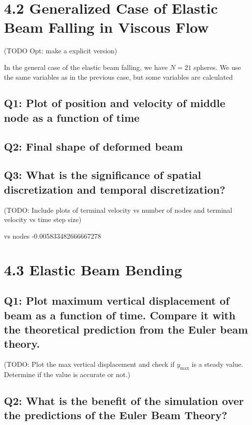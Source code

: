 \documentclass[letterpaper, 10 pt, conference]{ieeeconf}  %
\begin{document}
\section{4.2 Generalized Case of Elastic Beam Falling in Viscous Flow}

(TODO Opt: make a explicit version)

In the general case of the elastic beam falling, we have $N = 21$ spheres. We use the same variables as in the previous case, but some variables are calculated
\subsection{Q1: Plot of position and velocity of middle node as a function of time}

\subsection{Q2: Final shape of deformed beam}

\subsection{Q3: What is the significance of spatial discretization and temporal discretization? }

(TODO: Include plots of terminal velocity vs number of nodes and terminal velocity vs time step size)

vs nodes -0.005833482666667278


\section{4.3 Elastic Beam Bending}

\subsection{Q1: Plot maximum vertical displacement of beam as a function of time. Compare it with the theoretical prediction from the Euler beam theory.}

(TODO: Plot the max vertical displacement and check if $y_{\text{max}}$ is a steady value. Determine if the value is accurate or not.)

\subsection{Q2: What is the benefit of the simulation over the predictions of the Euler Beam Theory?}
\end{document}
